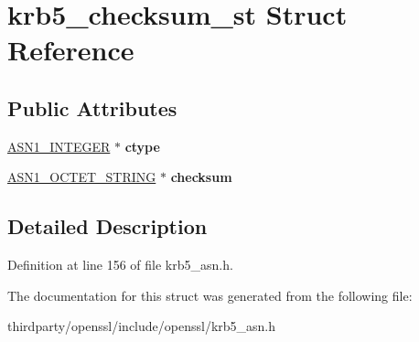 \hypertarget{structkrb5__checksum__st}{}\section{krb5\+\_\+checksum\+\_\+st Struct Reference}
\label{structkrb5__checksum__st}
\subsection*{Public Attributes}
\begin{DoxyCompactItemize}
\item 
\mbox{\label{structkrb5__checksum__st_ae066058605d0c59e10a98fbd71745705}} 
\hyperlink{structasn1__string__st}{A\+S\+N1\+\_\+\+I\+N\+T\+E\+G\+ER} $\ast$ {\bfseries ctype}
\item 
\mbox{\label{structkrb5__checksum__st_aaecf3ca4c97259edba8bc729103d81ba}} 
\hyperlink{structasn1__string__st}{A\+S\+N1\+\_\+\+O\+C\+T\+E\+T\+\_\+\+S\+T\+R\+I\+NG} $\ast$ {\bfseries checksum}
\end{DoxyCompactItemize}


\subsection{Detailed Description}


Definition at line 156 of file krb5\+\_\+asn.\+h.



The documentation for this struct was generated from the following file\+:\begin{DoxyCompactItemize}
\item 
thirdparty/openssl/include/openssl/krb5\+\_\+asn.\+h\end{DoxyCompactItemize}
